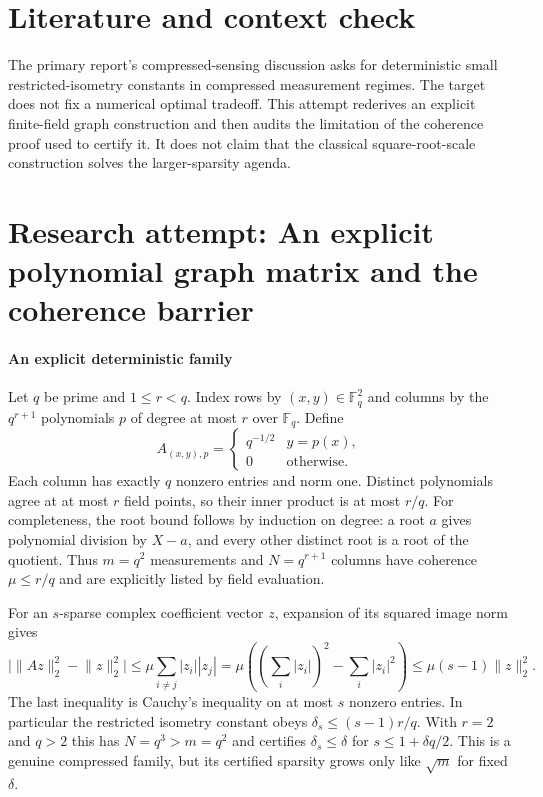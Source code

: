 \documentclass[11pt]{article}
\begin{document}
\section{Literature and context check}
The primary report's compressed-sensing discussion asks for deterministic small restricted-isometry constants in compressed measurement regimes. The target does not fix a numerical optimal tradeoff. This attempt rederives an explicit finite-field graph construction and then audits the limitation of the coherence proof used to certify it. It does not claim that the classical square-root-scale construction solves the larger-sparsity agenda.
\section{Research attempt: An explicit polynomial graph matrix and the coherence barrier}

\paragraph{An explicit deterministic family}
Let $q$ be prime and $1\leq r<q$. Index rows by $(x,y)\in\mathbb F_q^2$ and columns by the $q^{r+1}$ polynomials $p$ of degree at most $r$ over $\mathbb F_q$. Define
\[
 A_{(x,y),p}=\begin{cases}q^{-1/2}&y=p(x),\\0&\text{otherwise.}\end{cases}
\]
Each column has exactly $q$ nonzero entries and norm one. Distinct polynomials agree at at most $r$ field points, so their inner product is at most $r/q$. For completeness, the root bound follows by induction on degree: a root $a$ gives polynomial division by $X-a$, and every other distinct root is a root of the quotient. Thus $m=q^2$ measurements and $N=q^{r+1}$ columns have coherence $\mu\leq r/q$ and are explicitly listed by field evaluation.

For an $s$-sparse complex coefficient vector $z$, expansion of its squared image norm gives
\[
 \bigl|\lVert Az\rVert_2^2-\lVert z\rVert_2^2\bigr|
 \leq\mu\sum_{i\ne j}|z_i||z_j|
 =\mu\left(\left(\sum_i|z_i|\right)^2-\sum_i|z_i|^2\right)
 \leq\mu(s-1)\lVert z\rVert_2^2.
\]
The last inequality is Cauchy's inequality on at most $s$ nonzero entries. In particular the restricted isometry constant obeys $\delta_s\leq(s-1)r/q$. With $r=2$ and $q>2$ this has $N=q^3>m=q^2$ and certifies $\delta_s\leq\delta$ for $s\leq1+\delta q/2$. This is a genuine compressed family, but its certified sparsity grows only like $\sqrt m$ for fixed $\delta$.
\end{document}
